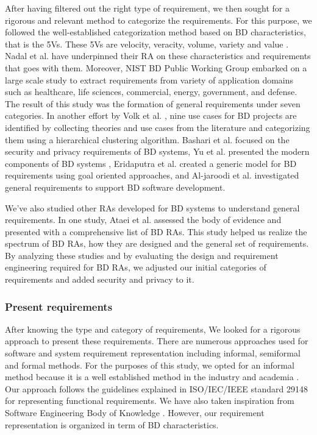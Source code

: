 \documentclass[review]{elsarticle}
\begin{document}
After having filtered out the right type of requirement, we then sought for a rigorous and relevant method to categorize the requirements. For this purpose, we followed the well-established categorization method based on BD characteristics, that is the 5Vs. These 5Vs are velocity, veracity, volume, variety and value \cite{Bughin2016, rad2017big}. Nadal et al. \cite{nadal2017software} have underpinned their RA on these characteristics and requirements that goes with them. Moreover, NIST BD Public Working Group embarked on a large scale study to extract requirements from variety of application domains such as healthcare, life sciences, commercial, energy, government, and defense. The result of this study was the formation of general requirements under seven categories. In another effort by Volk et al. \cite{volk2020identifying}, nine use cases for BD projects are identified by collecting theories and use cases from the literature and categorizing them using a hierarchical clustering algorithm. Bashari et al. \cite{bashari2016security} focused on the security and privacy requirements of BD systems, Yu et al. presented the modern components of BD systems \cite{yu2019components}, Eridaputra et al. \cite{eridaputra2014modeling} created a generic model for BD requirements using goal oriented approaches, and Al-jaroodi et al. \cite{al2016characteristics} investigated general requirements to support BD software development. 

We've also studied other RAs developed for BD systems to understand general requirements. In one study, Ataei et al. \cite{ataei2020big} assessed the body of evidence and presented with a comprehensive list of BD RAs. This study helped us realize the spectrum of BD RAs, how they are designed and the general set of requirements. By analyzing these studies and by evaluating the design and requirement engineering required for BD RAs, we adjusted our initial categories of requirements and added security and privacy to it.

\subsubsection{Present requirements}
After knowing the type and category of requirements, We looked for a rigorous approach to present these requirements. There are numerous approaches used for software and system requirement representation including informal, semiformal and formal methods. For the purposes of this study, we opted for an informal method because it is a well established method in the industry and academia \cite{kassab2014state}. Our approach follows the guidelines explained in ISO/IEC/IEEE standard 29148 \cite{ISO29148} for representing functional requirements. We have also taken inspiration from Software Engineering Body of Knowledge \cite{abran2004software}. However, our requirement representation is organized in term of BD characteristics. 
\end{document}
